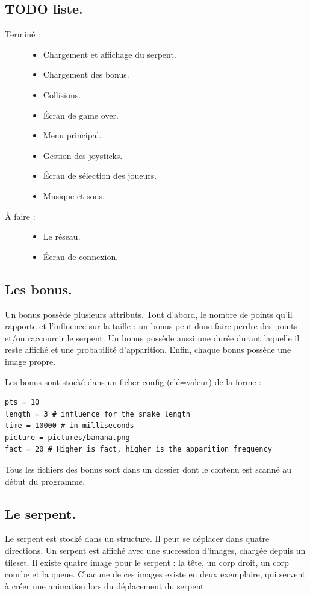 \documentclass{article}
\begin{document}
\subsection{TODO liste.}
\begin{description}
	\item[Terminé :] \begin{itemize}
			\item Chargement et affichage du serpent.
			\item Chargement des bonus.
			\item Collisions.
			\item Écran de game over.
			\item Menu principal.
			\item Gestion des joysticks.
			\item Écran de sélection des joueurs.
			\item Musique et sons.
		\end{itemize}
	\item[À faire :] \begin{itemize}
			\item Le réseau.
			\item Écran de connexion.
		\end{itemize}
\end{description}

\subsection{Les bonus.}
Un bonus possède plusieurs attributs. Tout d'abord, le nombre de points qu'il rapporte et l'influence sur la taille : un bonus peut donc faire perdre des points et/ou raccourcir le serpent. Un bonus possède aussi une durée durant laquelle il reste affiché et une probabilité d'apparition. Enfin, chaque bonus possède une image propre.

Les bonus sont stocké dans un ficher config (clé=valeur) de la forme :
\begin{verbatim}
pts = 10
length = 3 # influence for the snake length
time = 10000 # in milliseconds
picture = pictures/banana.png
fact = 20 # Higher is fact, higher is the apparition frequency
\end{verbatim}

Tous les fichiers des bonus sont dans un dossier dont le contenu est scanné au début du programme.

\subsection{Le serpent.}
Le serpent est stocké dans un structure. Il peut se déplacer dans quatre directions. Un serpent est affiché avec une succession d'images, chargée depuis un tileset. Il existe quatre image pour le serpent : la tête, un corp droit, un corp courbe et la queue. Chacune de ces images existe en deux exemplaire, qui servent à créer une animation lors du déplacement du serpent.
\end{document}
